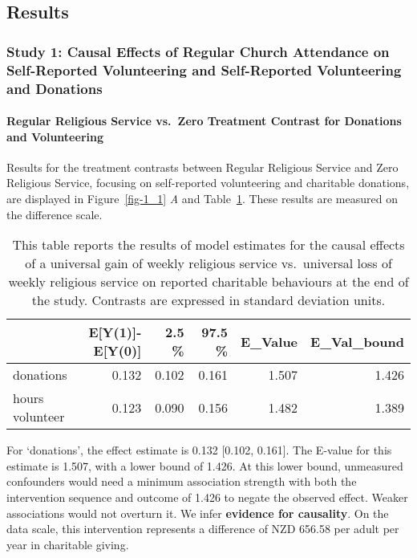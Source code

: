 \documentclass[
  single column]{article}
\let\oldparagraph\paragraph
\renewcommand{\paragraph}[1]{\oldparagraph{#1}\mbox{}}
\begin{document}
\newpage{}

\subsection{Results}\label{results}

\subsubsection{Study 1: Causal Effects of Regular Church Attendance on
Self-Reported Volunteering and Self-Reported Volunteering and
Donations}\label{study-1-causal-effects-of-regular-church-attendance-on-self-reported-volunteering-and-self-reported-volunteering-and-donations}

\paragraph{Regular Religious Service vs.~Zero Treatment Contrast for
Donations and
Volunteering}\label{regular-religious-service-vs.-zero-treatment-contrast-for-donations-and-volunteering}

Results for the treatment contrasts between Regular Religious Service
and Zero Religious Service, focusing on self-reported volunteering and
charitable donations, are displayed in Figure~\ref{fig-1_1} \emph{A} and
Table~\ref{tbl-1_1}. These results are measured on the difference scale.

\begin{longtable}[]{@{}lrrrrr@{}}

\caption{\label{tbl-1_1}This table reports the results of model
estimates for the causal effects of a universal gain of weekly religious
service vs.~universal loss of weekly religious service on reported
charitable behaviours at the end of the study. Contrasts are expressed
in standard deviation units.}

\tabularnewline

\toprule\noalign{}
& E{[}Y(1){]}-E{[}Y(0){]} & 2.5 \% & 97.5 \% & E\_Value &
E\_Val\_bound \\
\midrule\noalign{}
\endhead
\bottomrule\noalign{}
\endlastfoot
donations & 0.132 & 0.102 & 0.161 & 1.507 & 1.426 \\
hours volunteer & 0.123 & 0.090 & 0.156 & 1.482 & 1.389 \\

\end{longtable}

For `donations', the effect estimate is 0.132 {[}0.102, 0.161{]}. The
E-value for this estimate is 1.507, with a lower bound of 1.426. At this
lower bound, unmeasured confounders would need a minimum association
strength with both the intervention sequence and outcome of 1.426 to
negate the observed effect. Weaker associations would not overturn it.
We infer \textbf{evidence for causality}. On the data scale, this
intervention represents a difference of NZD 656.58 per adult per year in
charitable giving.
\end{document}
